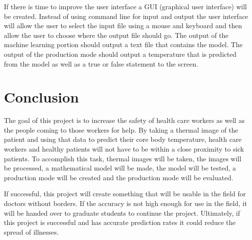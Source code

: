 \documentclass[onecolumn, draftclsnofoot,10pt, compsoc]{IEEEtran}
\begin{document}
If there is time to improve the user interface a GUI (graphical user interface) will be created. Instead of using command line for input and output the user interface will allow the user to select the input file using a mouse and keyboard and then allow the user to choose where the output file should go. The output of the machine learning portion should output a text file that contains the model. The output of the production mode should output a temperature that is predicted from the model as well as a true or false statement to the screen.\cite{BrianTech}

\section{Conclusion}

The goal of this project is to increase the safety of health care workers as well as the people coming to those workers for help. By taking a thermal image of the patient and using that data to predict their core body temperature, health care workers and healthy patients will not have to be within a close proximity to sick patients. To accomplish this task, thermal images will be taken, the images will be processed, a mathematical model will be made, the model will be tested, a production mode will be created and the production mode will be evaluated. 

If successful, this project will create something that will be usable in the field for doctors without borders. If the accuracy is not high enough for use in the field, it will be handed over to graduate students to continue the project. Ultimately, if this project is successful and has accurate prediction rates it could reduce the spread of illnesses.




\end{document}
